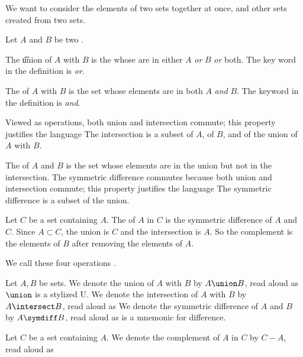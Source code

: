 

We want to consider the elements of two sets
together at once, and other sets created
from two sets.


Let $A$ and $B$ be two .

The \t{union} of $A$ with $B$ is the
 whose  are
in either $A$ \textit{or} $B$ \textit{or} both.
The key word in the definition is \textit{or}.

The  of $A$ with $B$ is
the set whose elements are in both $A$ \textit{and} $B$.
The keyword in the definition is \textit{and}.

Viewed as operations, both union and intersection commute;
this property justifies the language 
The intersection is a subset of $A$, of $B$,
and of the union of $A$ with $B$.

The 
of $A$ and $B$ is the set whose elements are in the union
but not in the intersection.
The symmetric difference commutes because both union and
intersection commute; this property justifies the
language 
The symmetric difference is a subset of the union.


Let $C$ be a set containing $A$.
The  of $A$ in $C$ is
the symmetric difference of $A$ and $C$.
Since $A \subset C$, the union is $C$ and the
intersection is $A$.
So the complement is the  elements of $B$ after removing the elements of $A$.

We call these four operations
.


Let $A, B$ be sets.
We denote the union of $A$ with $B$ by $A \union B$, read aloud as 
$\union$ is a stylized U.
We denote the intersection of $A$ with $B$ by $A \intersect B$, read aloud as 
We denote the symmetric difference of $A$ and $B$ by $A \symdiff B$, read aloud as 
 is a mnemonic for difference.

Let $C$ be a set containing $A$.
We denote the complement of $A$ in $C$ by $C - A$, read aloud as 

